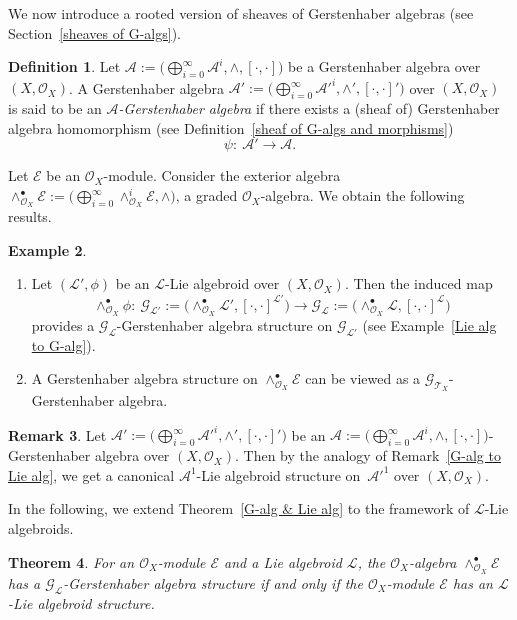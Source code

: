 \documentclass[pdftex]{sigma}
\numberwithin{equation}{section}
\newtheorem{Thm}{Theorem}[section]
\theoremstyle{definition}
\newtheorem{Def}[Thm]{Definition}
\newtheorem{Exm}[Thm]{Example}
\newtheorem{Rem}[Thm]{Remark}
\begin{document}
We now introduce a rooted version of sheaves of Gerstenhaber algebras (see Section~\ref{sheaves of G-algs}).
\begin{Def} Let $\mathcal{A}:=\bigl(\bigoplus^{\infty}_{i=0} \mathcal{A}^i, \wedge, [\cdot, \cdot]\bigr)$ be a Gerstenhaber algebra over $(X, \mathcal{O}_X)$. A Gerstenhaber algebra $\mathcal{A'}:=\bigl(\bigoplus^{\infty}_{i=0} \mathcal{A'}^i, \wedge', [\cdot, \cdot]'\bigr)$ over $(X, \mathcal{O}_X)$ is said to be an \emph{$\mathcal{A}$-Gerstenhaber algebra} if there exists a (sheaf of) Gerstenhaber algebra homomorphism (see Definition~\ref{sheaf of G-algs and morphisms})
\[
\psi\colon \ \mathcal{A'} \rightarrow \mathcal{A}.
\]
\end{Def}
	Let $\mathcal{E}$ be an $\mathcal{O}_X$-module. Consider the exterior algebra $\wedge_{\mathcal{O}_X}^\bullet \mathcal{E}:=\bigl(\bigoplus^{\infty}_{i=0} \wedge_{\mathcal{O}_X}^i \mathcal{E}, \wedge\bigr)$, a graded $\mathcal{O}_X$-algebra. We obtain the following results.

\begin{Exm}\quad
	\begin{enumerate}\itemsep=0pt
\item Let $(\mathcal{L'},\phi)$ be an $\mathcal{L}$-Lie algebroid over $(X,\mathcal{O}_X)$. Then the induced map
\[
\wedge_{\mathcal{O}_X}^\bullet \phi\colon \ \mathcal{G}_{\mathcal{L'}}:=\bigl(\wedge_{\mathcal{O}_X}^\bullet \mathcal{L'}, [\cdot,\cdot]^{\mathcal{L'}}\bigr) \rightarrow \mathcal{G}_{\mathcal{L}}:=\bigl(\wedge_{\mathcal{O}_X}^\bullet \mathcal{L}, [\cdot,\cdot]^{\mathcal{L}}\bigr)
\]
 provides a $\mathcal{G}_{\mathcal{L}}$-Gerstenhaber algebra structure on $\mathcal{G}_{\mathcal{L'}}$ (see Example~\ref{Lie alg to G-alg}).
		\item A Gerstenhaber algebra structure on $\wedge^\bullet_{\mathcal{O}_X} \mathcal{E}$ can be viewed as a $\mathcal{G}_{\mathcal{T}_X}$-Gerstenhaber algebra.
	\end{enumerate}
\end{Exm}

\begin{Rem}
	Let $\mathcal{A}':=\bigl(\bigoplus^{\infty}_{i=0} \mathcal{A}'^i, \wedge', [\cdot, \cdot]'\bigr)$ be an $\mathcal{A}:=\bigl(\bigoplus^{\infty}_{i=0} \mathcal{A}^i, \wedge, [\cdot, \cdot]\bigr)$-Gerstenhaber algebra over $(X, \mathcal{O}_X)$. Then by the analogy of Remark~\ref{G-alg to Lie alg}, we get a canonical $\mathcal{A}^1$-Lie algebroid structure on~$\mathcal{A}'^1$ over $(X,\mathcal{O}_X)$.
\end{Rem}
In the following, we extend Theorem~\ref{G-alg & Lie alg} to the framework of $\mathcal{L}$-Lie algebroids.
\begin{Thm} \label{L-version of G-alg & Lie alg}
For an $\mathcal{O}_X$-module $\mathcal{E}$ and a Lie algebroid $\mathcal{L}$, the $\mathcal{O}_X$-algebra $\wedge_{\mathcal{O}_X}^\bullet \mathcal{E}$ has a $\mathcal{G}_{\mathcal{L}}$-Gerstenhaber algebra structure if and only if the $\mathcal{O}_X$-module $\mathcal{E}$ has an $\mathcal{L}$-Lie algebroid structure.
\end{Thm}
\end{document}
